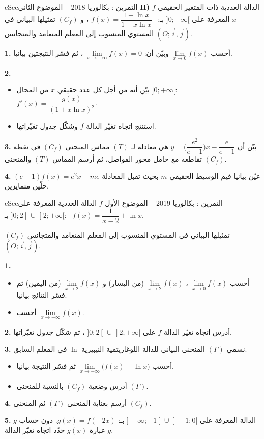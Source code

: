 \documentclass[12pt,a4paper]{article}
\newenvironment{BOX}[2]{\begin{otherlanguage}{english}\begin{arbox}{#1}{#2}}{\end{arbox}\end{otherlanguage}}
\newcounter{exo}
\newenvironment{tamrin}[1]{\stepcounter{exo}\begin{BOX}{cSec}{التمرين \theexo: #1}}{\end{BOX}}
\newenvironment{sq}{\begin{itemize}[leftmargin=2.4em,itemsep=3pt]}{\end{itemize}}
\newcommand{\qa}{\item[(أ)]}\newcommand{\qb}{\item[(ب)]}\newcommand{\qc}{\item[(جـ)]}\newcommand{\qd}{\item[(د)]}\newcommand{\qe}{\item[(هـ)]}
\newcommand{\QQ}[1]{\par\smallskip\textbf{#1.} }
\begin{document}
\begin{tamrin}{بكالوريا 2018 -- الموضوع الثاني}
\textbf{II)} $f$ الدالة العددية ذات المتغير الحقيقي $x$ المعرفة على $]0;+\infty[$ بـ: \ $f(x)=\dfrac{1+\ln x}{1+x\ln x}$ ،
و $(C_f)$ تمثيلها البياني في المستوي المنسوب إلى المعلم المتعامد والمتجانس $(O;\vec i,\vec j)$.
\QQ{1} أحسب $\lim\limits_{x\to0}f(x)$ وبيّن أن: $\lim\limits_{x\to+\infty}f(x)=0$ ، ثم فسّر النتيجتين بيانيا.
\QQ{2}
\begin{sq}
\qa بيّن أنه من أجل كل عدد حقيقي $x$ من المجال $]0;+\infty[$: \ $f'(x)=\dfrac{g(x)}{(1+x\ln x)^2}$.
\qb استنتج اتجاه تغيّر الدالة $f$ وشكّل جدول تغيّراتها.
\end{sq}
\QQ{3} بيّن أن $y=\Big(\dfrac{e^2}{e-1}\Big)x-\dfrac{e}{e-1}$ هي معادلة لـ $(T)$ مماس المنحنى $(C_f)$ في نقطة تقاطعه مع حامل محور الفواصل، ثم أرسم المماس $(T)$ والمنحنى $(C_f)$.
\QQ{4} عيّن بيانيا قيم الوسيط الحقيقي $m$ بحيث تقبل المعادلة $(e-1)f(x)=e^2x-me$ حلّين متمايزين.
\end{tamrin}

\begin{tamrin}{بكالوريا 2019 -- الموضوع الأول}
$f$ الدالة العددية المعرفة على $]0;2[\,\cup\,]2;+\infty[$ بـ: \ $f(x)=\dfrac{1}{x-2}+\ln x$.

$(C_f)$ تمثيلها البياني في المستوي المنسوب إلى المعلم المتعامد والمتجانس $(O;\vec i,\vec j)$.
\QQ{1}
\begin{sq}
\qa أحسب $\lim\limits_{x\to0}f(x)$ ، $\lim\limits_{x\to2}f(x)$ (من اليسار) و $\lim\limits_{x\to2}f(x)$ (من اليمين) ثم فسّر النتائج بيانيا.
\qb أحسب $\lim\limits_{x\to+\infty}f(x)$.
\end{sq}
\QQ{2} أدرس اتجاه تغيّر الدالة $f$ على $]0;2[\,\cup\,]2;+\infty[$ ، ثم شكّل جدول تغيّراتها.
\QQ{3} نسمي $(\Gamma)$ المنحنى البياني للدالة اللوغاريتمية النيبيرية $\ln$ في المعلم السابق.
\begin{sq}
\qa أحسب $\lim\limits_{x\to+\infty}\big(f(x)-\ln x\big)$ ثم فسّر النتيجة بيانيا.
\qb أدرس وضعية $(C_f)$ بالنسبة للمنحنى $(\Gamma)$.
\end{sq}
\QQ{4} أرسم بعناية المنحنى $(\Gamma)$ ثم المنحنى $(C_f)$.
\QQ{5} $g$ الدالة المعرفة على $]-\infty;-1[\,\cup\,]-1;0[$ بـ: $g(x)=f(-2x)$. دون حساب عبارة $g(x)$ حدّد اتجاه تغيّر الدالة $g$.
\end{tamrin}
\end{document}
